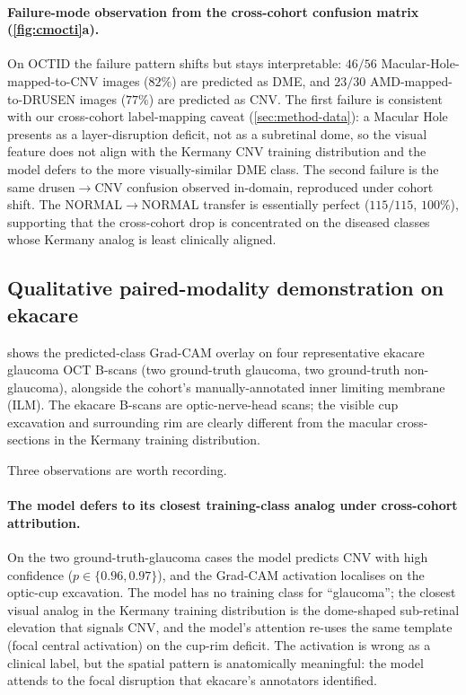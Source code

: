 \documentclass[5p]{elsarticle}
\begin{document}
\paragraph{Failure-mode observation from the cross-cohort confusion matrix (\cref{fig:cmocti}a).}
On OCTID the failure pattern shifts but stays interpretable: $46/56$ Macular-Hole-mapped-to-CNV images ($82\%$) are predicted as DME, and $23/30$ AMD-mapped-to-DRUSEN images ($77\%$) are predicted as CNV. The first failure is consistent with our cross-cohort label-mapping caveat (\cref{sec:method-data}): a Macular Hole presents as a layer-disruption deficit, not as a subretinal dome, so the visual feature does not align with the Kermany CNV training distribution and the model defers to the more visually-similar DME class. The second failure is the same drusen$\rightarrow$CNV confusion observed in-domain, reproduced under cohort shift. The NORMAL$\rightarrow$NORMAL transfer is essentially perfect ($115/115$, $100\%$), supporting that the cross-cohort drop is concentrated on the diseased classes whose Kermany analog is least clinically aligned.

\subsection{Qualitative paired-modality demonstration on ekacare}
\label{sec:ekacare-qual}
 shows the predicted-class Grad-CAM overlay on four representative ekacare glaucoma OCT B-scans (two ground-truth glaucoma, two ground-truth non-glaucoma), alongside the cohort's manually-annotated inner limiting membrane (ILM). The ekacare B-scans are optic-nerve-head scans; the visible cup excavation and surrounding rim are clearly different from the macular cross-sections in the Kermany training distribution.

Three observations are worth recording.

\paragraph{The model defers to its closest training-class analog under cross-cohort attribution.}
On the two ground-truth-glaucoma cases the model predicts CNV with high confidence ($p \in \{0.96, 0.97\}$), and the Grad-CAM activation localises on the optic-cup excavation. The model has no training class for ``glaucoma''; the closest visual analog in the Kermany training distribution is the dome-shaped sub-retinal elevation that signals CNV, and the model's attention re-uses the same template (focal central activation) on the cup-rim deficit. The activation is wrong as a clinical label, but the spatial pattern is anatomically meaningful: the model attends to the focal disruption that ekacare's annotators identified.
\end{document}
